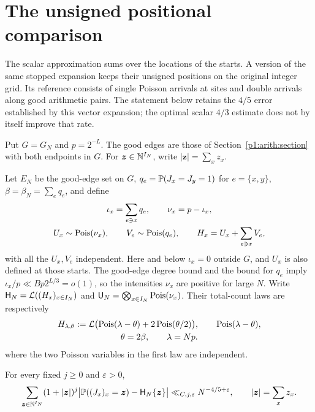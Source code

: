 \section{The unsigned positional comparison}
\label{p14:positions:section}

The scalar approximation sums over the locations of the starts. A version
of the same stopped expansion keeps their unsigned positions on the
original integer grid. Its reference consists of single Poisson arrivals
at sites and double arrivals along good arithmetic pairs. The statement
below retains the $4/5$ error established by this vector expansion; the
optimal scalar $4/3$ estimate does not by itself improve that rate.

Put $G=G_N$ and $p=2^{-L}$. The good edges are those of
Section~\ref{p1:arith:section} with both endpoints in $G$. For
$\boldsymbol z\in\N^{I_N}$, write $|\boldsymbol z|=\sum_xz_x$.

Let $E_N$ be the good-edge set on $G$,
$q_e=\P(J_x=J_y=1)$ for $e=\{x,y\}$,
$\beta=\beta_N=\sum_e q_e$, and define
\begin{equation}
 \begin{gathered}
 \iota_x=\sum_{e\ni x}q_e,\qquad \nu_x=p-\iota_x,\\
 U_x\sim\Pois(\nu_x),\qquad V_e\sim\Pois(q_e),\qquad
 H_x=U_x+\sum_{e\ni x}V_e,
 \end{gathered}
 \label{p1:limits:field-definition}
\end{equation}
with all the $U_x,V_e$ independent.  Here and below $\iota_x=0$
outside $G$, and $U_x$ is also defined at those starts.
The good-edge degree bound and the bound for $q_e$ imply
$\iota_x/p\ll Bp2^{L/3}=o(1)$, so the intensities $\nu_x$ are
positive for large $N$.  Write $\mathsf H_N=\Law((H_x)_{x\in I_N})$
and $\mathsf U_N=\bigotimes_{x\in I_N}\Pois(\nu_x)$.
Their total-count laws are respectively
\begin{equation}
 \begin{gathered}
 H_{\lambda,\theta}
   :=\Law\bigl(\Pois(\lambda-\theta)
                     +2\Pois(\theta/2)\bigr),\qquad
 \Pois(\lambda-\theta),\\
 \theta=2\beta,\qquad\lambda=Np.
 \end{gathered}
 \label{p1:limits:compound-target}
\end{equation}
where the two Poisson variables in the first law are independent.

\begin{lemma}
\label{p1:limits:vector-reference}
For every fixed $j\ge0$ and $\varepsilon>0$,
\begin{equation}
 \sum_{\boldsymbol z\in\mathbb N^{I_N}}
 (1+|\boldsymbol z|)^j
 \big|\P((J_x)_x=\boldsymbol z)-\mathsf H_N\{\boldsymbol z\}\big|
       \ll_{C,j,\varepsilon}N^{-4/5+\varepsilon},
 \qquad |\boldsymbol z|=\sum_xz_x.
 \label{p1:limits:vector-weighted}
\end{equation}
\end{lemma}

